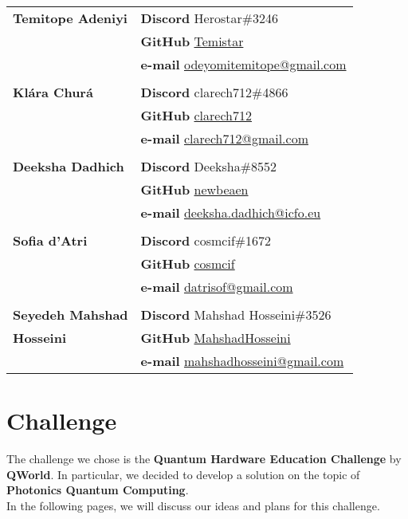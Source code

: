 \documentclass[hidelinks, a4paper,12pt]{article}
\begin{document}
\begin{tabular}{p{.275\linewidth} p{.65\linewidth}}
\textbf{Temitope Adeniyi} &\textbf{Discord} Herostar\#3246\\[.3em]
                        &\textbf{GitHub} \href{https://github.com/Temistar}{Temistar}\\[.3em]
                        &\textbf{e-mail} \href{mailto:odeyomitemitope@gmail.com}{odeyomitemitope@gmail.com}\\[.5em]
\\
\textbf{Klára Churá} &\textbf{Discord} clarech712\#4866\\[.3em]
                        &\textbf{GitHub} \href{https://github.com/clarech712}{clarech712}\\[.3em]
                        &\textbf{e-mail} \href{mailto:clarech712@gmail.com}{clarech712@gmail.com}\\[.5em]
\\
\textbf{Deeksha Dadhich} &\textbf{Discord} Deeksha\#8552\\[.3em]
                        &\textbf{GitHub} \href{https://github.com/newbeaen}{newbeaen}\\[.3em]
                        &\textbf{e-mail} \href{mailto:deeksha.dadhich@icfo.eu}{deeksha.dadhich@icfo.eu}\\[.5em]
\\
\textbf{Sofia d'Atri} &\textbf{Discord} cosmcif\#1672\\[.3em]
                        &\textbf{GitHub} \href{https://github.com/cosmcif}{cosmcif}\\[.3em]
                        &\textbf{e-mail} \href{mailto:datrisof@gmail.com}{datrisof@gmail.com}\\[.5em]
\\
\textbf{Seyedeh Mahshad} &\textbf{Discord} Mahshad Hosseini\#3526\\[.3em]
\textbf{Hosseini} &\textbf{GitHub} \href{https://github.com/MahshadHosseini}{MahshadHosseini}\\[.3em]
                        &\textbf{e-mail} \href{mailto:mahshadhosseini@gmail.com}{mahshadhosseini@gmail.com}\\[.5em]
\end{tabular}

\section{Challenge}
The challenge we chose is the \textbf{Quantum Hardware Education Challenge} by \textbf{QWorld}. In particular, we decided to develop a solution on the topic of \textbf{Photonics Quantum Computing}.\\In the following pages, we will discuss our ideas and plans for this challenge.
\end{document}
